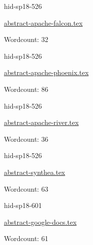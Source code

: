 

\begin{IU}

hid-sp18-526

\href{https://github.com/cloudmesh-community/hid-sp18-526/blob/master//technology/abstract-apache-falcon.tex}{abstract-apache-falcon.tex}

 

Wordcount: 32

\end{IU}



\begin{IU}

hid-sp18-526

\href{https://github.com/cloudmesh-community/hid-sp18-526/blob/master//technology/abstract-apache-phoenix.tex}{abstract-apache-phoenix.tex}

 

Wordcount: 86

\end{IU}



\begin{IU}

hid-sp18-526

\href{https://github.com/cloudmesh-community/hid-sp18-526/blob/master//technology/abstract-apache-river.tex}{abstract-apache-river.tex}

 

Wordcount: 36

\end{IU}



\begin{IU}

hid-sp18-526

\href{https://github.com/cloudmesh-community/hid-sp18-526/blob/master//technology/abstract-synthea.tex}{abstract-synthea.tex}

 

Wordcount: 63

\end{IU}



\begin{IU}

hid-sp18-601

\href{https://github.com/cloudmesh-community/hid-sp18-601/blob/master//technology/abstract-google-docs.tex}{abstract-google-docs.tex}

 

Wordcount: 61

\end{IU}

